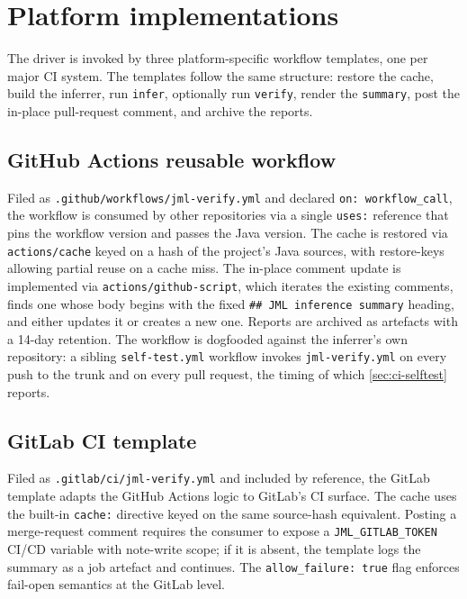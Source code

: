 \section{Platform implementations}
\label{sec:ci-platforms}

The driver is invoked by three platform-specific workflow templates, one per
major CI system. The templates follow the same structure: restore the cache,
build the inferrer, run \texttt{infer}, optionally run \texttt{verify}, render
the \texttt{summary}, post the in-place pull-request comment, and archive the
reports.

\subsection{GitHub Actions reusable workflow}

Filed as \texttt{.github/workflows/jml-verify.yml} and declared
\texttt{on:~workflow\_call}, the workflow is consumed by other repositories via a
single \texttt{uses:} reference that pins the workflow version and passes the
Java version. The cache is restored via \texttt{actions/cache} keyed on a hash of
the project's Java sources, with restore-keys allowing partial reuse on a cache
miss. The in-place comment update is implemented via
\texttt{actions/github-script}, which iterates the existing comments, finds one
whose body begins with the fixed \texttt{\#\# JML inference summary} heading, and
either updates it or creates a new one. Reports are archived as artefacts with a
14-day retention. The workflow is dogfooded against the inferrer's own
repository: a sibling \texttt{self-test.yml} workflow invokes
\texttt{jml-verify.yml} on every push to the trunk and on every pull request, the
timing of which \cref{sec:ci-selftest} reports.

\subsection{GitLab CI template}

Filed as \texttt{.gitlab/ci/jml-verify.yml} and included by reference, the GitLab
template adapts the GitHub Actions logic to GitLab's CI surface. The cache uses
the built-in \texttt{cache:} directive keyed on the same source-hash equivalent.
Posting a merge-request comment requires the consumer to expose a
\texttt{JML\_GITLAB\_TOKEN} CI/CD variable with note-write scope; if it is
absent, the template logs the summary as a job artefact and continues. The
\texttt{allow\_failure: true} flag enforces fail-open semantics at the GitLab
level.

